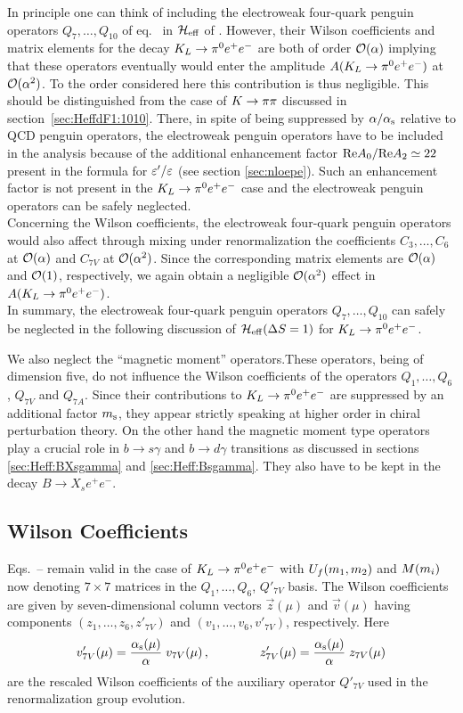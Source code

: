 In principle one can think of including the electroweak four-quark
penguin operators $Q_7,\ldots,Q_{10}$ of eq.~ in
${\cal H}_{\rm eff}$ of . However, their Wilson coefficients and
matrix elements for the decay $K_L \to \pi^0 e^+ e^-$ are both of order ${\cal O}(\alpha)$
implying that these operators eventually would enter the amplitude
$A(K_L \to \pi^0 e^+ e^-)$ at ${\cal O}(\alpha^2)$.  To the order considered here this
contribution is thus negligible. This should be distinguished from the
case of $K \to \pi\pi$ discussed in section~\ref{sec:HeffdF1:1010}. There, in
spite of being suppressed by $\alpha/\alpha_{\rm s}$ relative to QCD penguin
operators, the electroweak penguin operators have to be included in the
analysis because of the additional enhancement factor ${\rm Re} A_0/{\rm Re} A_2
\simeq 22$ present in the formula for $\varepsilon'/\varepsilon$ (see section
\ref{sec:nloepe}). Such an enhancement factor is not present in the
$K_L \to \pi^0 e^+ e^-$ case and the electroweak penguin operators can be safely
neglected. \\
Concerning the Wilson coefficients, the electroweak four-quark penguin
operators would also affect through mixing under renormalization the
coefficients $C_3,\ldots,C_6$ at ${\cal O}(\alpha)$ and $C_{7V}$ at
${\cal O}(\alpha^2)$.  Since the corresponding matrix elements are
${\cal O}(\alpha)$ and ${\cal O}(1)$, respectively, we again obtain a negligible
${\cal O}(\alpha^2)$ effect in $A(K_L \to \pi^0 e^+ e^-)$. \\
In summary, the electroweak four-quark penguin operators $Q_7, \ldots,
Q_{10}$ can safely be neglected in the following discussion of
${\cal H}_{\rm eff}(\Delta S=1)$ for $K_L \to \pi^0 e^+ e^-$.

We also neglect the ``magnetic moment'' operators.These operators,
being of dimension five, do not influence the Wilson coefficients of
the operators $Q_1,\ldots,Q_6$, $Q_{7V}$ and $Q_{7A}$. Since their
contributions to $K_L \to \pi^0 e^+ e^-$ are suppressed by an additional factor $m_{\rm s}$,
they appear strictly speaking at higher order in chiral perturbation
theory. On the other hand the magnetic moment type operators play a
crucial role in $b \to s \gamma$ and $b \to d \gamma$ transitions as
discussed in sections \ref{sec:Heff:BXsgamma} and
\ref{sec:Heff:Bsgamma}. They also have to be kept in the decay $B\to
X_se^+e^-$.

\subsection{Wilson Coefficients}
            \label{sec:HeffKpe:wc}
Eqs.~-- remain valid in the case of $K_L \to \pi^0 e^+ e^-$ with
$U_{f}(m_1,m_2)$ and $M(m_i)$ now denoting $7 \times 7$ matrices in
the $Q_1,\ldots,Q_6$, $Q'_{7V}$ basis. The Wilson coefficients are
given by seven-dimensional column vectors $\vec{z}(\mu)$ and
$\vec{v}(\mu)$ having components $(z_1,\ldots,z_6,z'_{7V})$ and
$(v_1,\ldots,v_6,v'_{7V})$, respectively. Here
\begin{equation}
v'_{7V}(\mu) = \frac{\alpha_{\rm s}(\mu)}{\alpha} \; v_{7V}(\mu) \, ,
\qquad\qquad
z'_{7V}(\mu) = \frac{\alpha_{\rm s}(\mu)}{\alpha} \; z_{7V}(\mu)
\end{equation}
are the rescaled Wilson coefficients of the auxiliary operator $Q'_{7V}$
used in the renormalization group evolution.

